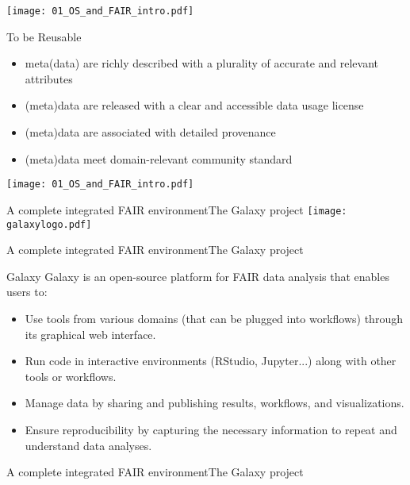 \begin{frame}
\texttt{[image: 01\_OS\_and\_FAIR\_intro.pdf]}
\end{frame}

\begin{frame}
\begin{block}{To be Reusable}
\begin{itemize}
\item meta(data) are richly described with a plurality of accurate and relevant attributes
\item (meta)data are released with a clear and accessible data usage license
\item (meta)data are associated with detailed provenance
\item (meta)data meet domain-relevant community standard
\end{itemize}
\end{block}
\end{frame}

\begin{frame}
\centering\texttt{[image: 01\_OS\_and\_FAIR\_intro.pdf]}
\end{frame}


\begin{frame}{A complete integrated FAIR environment}{The Galaxy project}
\centering\texttt{[image: galaxylogo.pdf]}
\end{frame}

\begin{frame}{A complete integrated FAIR environment}{The Galaxy project}
\begin{block}{Galaxy}
Galaxy is an open-source platform for FAIR data analysis that enables users to:
\begin{itemize}
\item Use tools from various domains (that can be plugged into workflows) through its graphical web interface.
\item Run code in interactive environments (RStudio, Jupyter...) along with other tools or workflows.
\item Manage data by sharing and publishing results, workflows, and visualizations.
\item Ensure reproducibility by capturing the necessary information to repeat and understand data analyses.
\end{itemize}
\end{block}
\end{frame}


\begin{frame}{A complete integrated FAIR environment}{The Galaxy project}
\end{frame}

